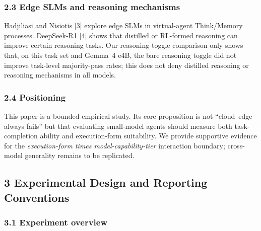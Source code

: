 \documentclass[
]{article}
\begin{document}
\subsubsection{2.3 Edge SLMs and reasoning mechanisms}
Hadjiliasi and Nisiotis [3] explore edge SLMs in virtual-agent Think/Memory processes. DeepSeek-R1 [4] shows that distilled or RL-formed reasoning can improve certain reasoning tasks. Our reasoning-toggle comparison only shows that, on this task set and Gemma~4 e4B, the bare reasoning toggle did not improve task-level majority-pass rates; this does not deny distilled reasoning or reasoning mechanisms in all models.

\subsubsection{2.4 Positioning}
This paper is a bounded empirical study. Its core proposition is not ``cloud--edge always fails'' but that evaluating small-model agents should measure both task-completion ability and execution-form suitability. We provide supportive evidence for the \emph{execution-form times model-capability-tier} interaction boundary; cross-model generality remains to be replicated.

\subsection{3 Experimental Design and Reporting Conventions}
\subsubsection{3.1 Experiment overview}
\begin{table}[ht]
\centering
\small
{}
\caption{Experiment overview.}
\label{tab:overview}
\end{table}
\end{document}
